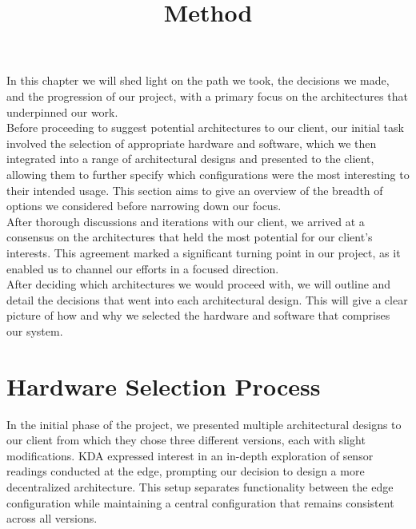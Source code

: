 \title{Method}

In this chapter we will shed light on the path we took, the decisions we made, and the progression of our project, with a primary focus on the architectures that underpinned our work.\\

Before proceeding to suggest potential architectures to our client, our initial task involved the selection of appropriate hardware and software, which we then integrated into a range of architectural designs and presented to the client, allowing them to further specify which configurations were the most interesting to their intended usage. This section aims to give an overview of the breadth of options we considered before narrowing down our focus.\\


After thorough discussions and iterations with our client, we arrived at a consensus on the architectures that held the most potential for our client's interests. This agreement marked a significant turning point in our project, as it enabled us to channel our efforts in a focused direction. \\

After deciding which architectures we would proceed with, we will outline and detail the decisions that went into each architectural design. This will give a clear picture of how and why we selected the hardware and software that comprises our system.\\
\newpage

\section{Hardware Selection Process}

In the initial phase of the project, we presented multiple architectural designs to our client from which they chose three different versions, each with slight modifications. KDA expressed interest in an in-depth exploration of sensor readings conducted at the edge, prompting our decision to design a more decentralized architecture. This setup separates functionality between the edge configuration while maintaining a central configuration that remains consistent across all versions.\\

